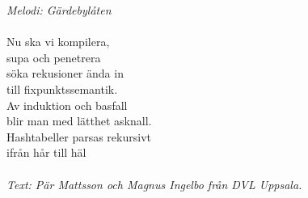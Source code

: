       {\footnotesize\textit{Melodi: Gärdebylåten}}\\
\\
Nu ska vi kompilera,\\
supa och penetrera\\
söka rekusioner ända in\\
till fixpunktssemantik.\\
Av induktion och basfall\\
blir man med lätthet asknall.\\
Hashtabeller parsas rekursivt\\
ifrån hår till häl\\
\\
{\footnotesize\textit{Text: Pär Mattsson och Magnus Ingelbo från DVL Uppsala.}}
